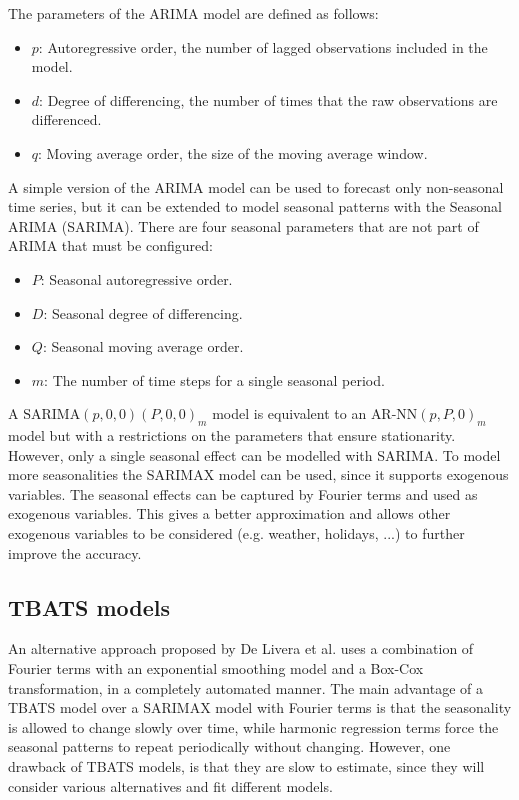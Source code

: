The parameters of the ARIMA model are defined as follows:
\begin{itemize}
  \item \( p \): Autoregressive order, the number of lagged observations included in the model.
  \item \( d \): Degree of differencing, the number of times that the raw observations are differenced.
  \item \( q \): Moving average order, the size of the moving average window.
\end{itemize}

A simple version of the ARIMA model can be used to forecast only non-seasonal time series, but it can be extended to model seasonal patterns with the Seasonal ARIMA (SARIMA). There are four seasonal parameters that are not part of ARIMA that must be configured:
\begin{itemize}
  \item \( P \): Seasonal autoregressive order.
  \item \( D \): Seasonal degree of differencing.
  \item \( Q \): Seasonal moving average order.
  \item \( m \): The number of time steps for a single seasonal period.
\end{itemize}
A \( \text{SARIMA}(p,0,0)(P,0,0)_m \) model is equivalent to an \( \text{AR-NN}(p,P,0)_m \) model but with a restrictions on the parameters that ensure stationarity.
However, only a single seasonal effect can be modelled with SARIMA. To model more seasonalities the SARIMAX model can be used, since it supports exogenous variables. The seasonal effects can be captured by Fourier terms and used as exogenous variables. This gives a better approximation and allows other exogenous variables to be considered (e.g. weather, holidays, ...) to further improve the accuracy.

\subsection{TBATS models}
\label{subsec:tbats_models}
An alternative approach proposed by De Livera et al. \cite{de_livera} uses a combination of Fourier terms with an exponential smoothing model and a Box-Cox transformation, in a completely automated manner. The main advantage of a TBATS model over a SARIMAX model with Fourier terms is that the seasonality is allowed to change slowly over time, while harmonic regression terms force the seasonal patterns to repeat periodically without changing. However, one drawback of TBATS models, is that they are slow to estimate, since they will consider various alternatives and fit different models.


